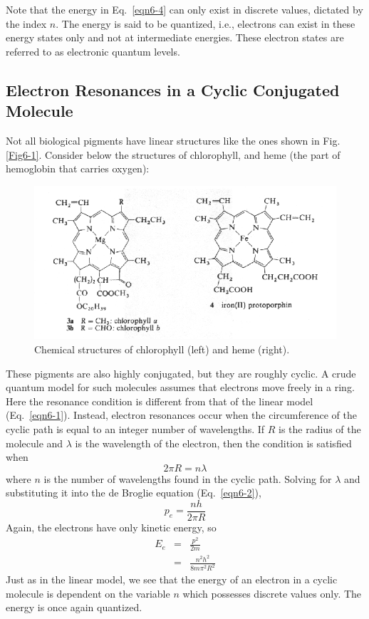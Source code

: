 Note that the energy in Eq.~\ref{eqn6-4} can only exist in discrete values, dictated by the index $n$. The energy is said to be quantized, i.e., electrons can exist in these energy states only and not at intermediate energies.  These electron states are referred to as electronic quantum levels.

\subsection{Electron Resonances in a Cyclic Conjugated Molecule}

Not all biological pigments have linear structures like the ones shown in Fig. \ref{Fig6-1}. Consider below the structures of chlorophyll, and heme (the part of hemoglobin that carries oxygen): 
\begin{figure}[h]
	\centering
	\includegraphics[width=\textwidth]{./figures/Topic6/Fig6-3.png}
	\caption{Chemical structures of chlorophyll (left) and heme (right).}
	\label{Fig6-3}
\end{figure}
These pigments are also highly conjugated, but they are roughly cyclic.  A crude quantum model for such molecules assumes that electrons move freely in a ring.  Here the resonance condition is different from that of the linear model (Eq.~\ref{eqn6-1}). Instead, electron resonances occur when the circumference of the cyclic path is equal to an integer number of wavelengths.  If $R$ is the radius of the molecule and $\lambda$ is the wavelength of the electron, then the condition is satisfied when
\begin{equation}\label{eqn6-5}
2\pi R= n\lambda
\end{equation}
where $n$ is the number of wavelengths found in the cyclic path. Solving for $\lambda$ and substituting it into the de Broglie equation (Eq.~\ref{eqn6-2}),
\begin{equation}\label{eqn6-6}
p_e=\frac{nh}{2\pi R}
\end{equation}
Again, the electrons have only kinetic energy, so 
\begin{eqnarray}\label{eqn6-7}
E_e&=&\frac{p^2}{2m}\nonumber\\
	&=&\frac{n^2h^2}{8m\pi^2R^2}
\end{eqnarray}
Just as in the linear model, we see that the energy of an electron in a cyclic molecule is dependent on the variable $n$ which possesses discrete values only.  The energy is once again quantized. 

